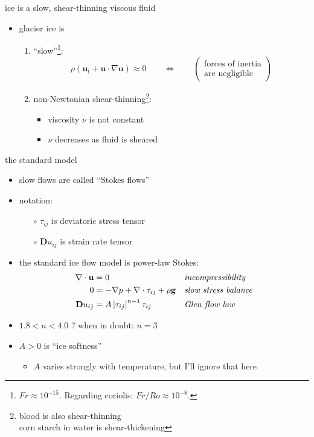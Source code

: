 \documentclass[hide notes,intlimits]{beamer}
\begin{document}
\begin{frame}{ice is a slow, shear-thinning viscous fluid}

\begin{itemize}
\item glacier ice is
  \begin{enumerate}
  \item ``slow''\footnote{$Fr\approx 10^{-15}$.  Regarding coriolis: $Fr/Ro \approx 10^{-8}$.}:
    $$\rho \left(\mathbf{u}_t + \mathbf{u}\cdot\nabla \mathbf{u}\right) \approx 0 \qquad \iff \qquad \begin{pmatrix} \text{forces of inertia} \\ \text{are negligible} \end{pmatrix}$$
  \item non-Newtonian shear-thinning\footnote{blood is also shear-thinning \\ \hspace{5mm} corn starch in water is shear-thickening}:
    \begin{itemize}
    \item viscosity $\nu$ is not constant
    \item $\nu$ decreases as fluid is sheared
    \end{itemize}
  \end{enumerate}
\end{itemize}
\end{frame}


\begin{frame}{the standard model}

\begin{itemize}
\item slow flows are called ``Stokes flows''
\item notation:
  \begin{itemize}
  \item[$\circ$] $\tau_{ij}$ is deviatoric stress tensor
  \item[$\circ$] $\mathbf{D}u_{ij}$ is strain rate tensor
  \end{itemize}
\smallskip
\item the standard ice flow model is power-law Stokes:
\begin{align*}
\nabla \cdot \mathbf{u} &= 0 &&\text{\emph{incompressibility}} \\
0 &= - \nabla p + \nabla \cdot \tau_{ij} + \rho \mathbf{g} &&\text{\emph{slow stress balance}} \\
\mathbf{D}u_{ij} &= A \left|\tau_{ij}\right|^{n-1} \tau_{ij} &&\text{\emph{Glen flow law}}
\end{align*}
\item $1.8 < n < 4.0$ ?  \quad \alert{when in doubt: $n=3$}
\medskip
\item $A>0$ is ``ice softness''
   \begin{itemize}
   \item $A$ varies strongly with temperature, but I'll ignore that here
   \end{itemize}
\end{itemize}
\end{frame}
\end{document}
